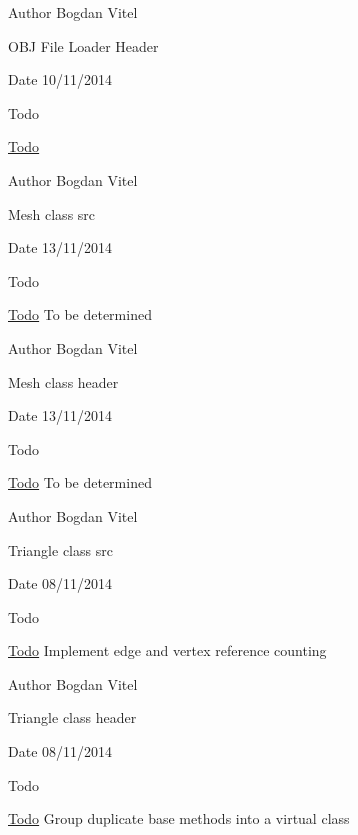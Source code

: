 \begin{DoxyAuthor}{Author}
Bogdan Vitel
\end{DoxyAuthor}
O\+B\+J File Loader Header \begin{DoxyDate}{Date}
10/11/2014 
\end{DoxyDate}
\begin{DoxyRefDesc}{Todo}
\item[\hyperlink{todo__todo000007}{Todo}]\begin{DoxyVerb}\end{DoxyVerb}
\end{DoxyRefDesc}


\begin{DoxyAuthor}{Author}
Bogdan Vitel
\end{DoxyAuthor}
Mesh class src \begin{DoxyDate}{Date}
13/11/2014 
\end{DoxyDate}
\begin{DoxyRefDesc}{Todo}
\item[\hyperlink{todo__todo000008}{Todo}]To be determined \end{DoxyRefDesc}


\begin{DoxyAuthor}{Author}
Bogdan Vitel
\end{DoxyAuthor}
Mesh class header \begin{DoxyDate}{Date}
13/11/2014 
\end{DoxyDate}
\begin{DoxyRefDesc}{Todo}
\item[\hyperlink{todo__todo000009}{Todo}]To be determined \end{DoxyRefDesc}


\begin{DoxyAuthor}{Author}
Bogdan Vitel
\end{DoxyAuthor}
Triangle class src \begin{DoxyDate}{Date}
08/11/2014 
\end{DoxyDate}
\begin{DoxyRefDesc}{Todo}
\item[\hyperlink{todo__todo000013}{Todo}]Implement edge and vertex reference counting \end{DoxyRefDesc}


\begin{DoxyAuthor}{Author}
Bogdan Vitel
\end{DoxyAuthor}
Triangle class header \begin{DoxyDate}{Date}
08/11/2014 
\end{DoxyDate}
\begin{DoxyRefDesc}{Todo}
\item[\hyperlink{todo__todo000014}{Todo}]Group duplicate base methods into a virtual class \end{DoxyRefDesc}


